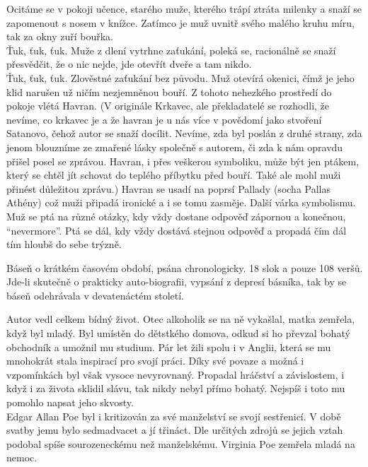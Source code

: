 \documentclass[FGBook.tex]{subfiles}
\begin{document}
{\setlength{\parindent}{0pt}\setlength{\parskip}{0.5em}
\noindent Ocitáme se v pokoji učence, starého muže, kterého trápí ztráta milenky
a snaží se zapomenout s nosem v knížce. Zatímco je muž uvnitř svého malého kruhu míru,
tak za okny zuří bouřka.\\
Ťuk, ťuk, ťuk. Muže z dlení vytrhne zaťukání, poleká se, racionálně se snaží přesvědčit,
že o nic nejde, jde otevřít dveře a tam nikdo.\\
Ťuk, ťuk, ťuk. Zlověstné zaťukání bez původu. Muž otevírá okenici,
čímž je jeho klid narušen už ničím nezjemněnou bouří.
Z tohoto nehezkého prostředí do pokoje vlétá Havran.
(V originále Krkavec, ale překladatelé se rozhodli, že nevíme, co krkavec je
a že havran je u nás více v povědomí jako stvoření Satanovo, čehož autor se snaží docílit.
Nevíme, zda byl poslán z druhé strany, zda jenom blouzníme ze zmařené lásky společně s autorem,
či zda k nám opravdu přišel posel se zprávou. Havran, i přes veškerou symboliku, může být jen ptákem,
který se chtěl jít schovat do teplého příbytku před bouří. Také ale mohl muži přinést důležitou zprávu.)
Havran se usadí na poprsí Pallady (socha Pallas Athény) což muži připadá ironické a i se tomu zasměje.
Další várka symbolismu.\\
Muž se ptá na různé otázky, kdy vždy dostane odpověď zápornou a konečnou, \enquote{nevermore}.
Ptá se dál, kdy vždy dostává stejnou odpověď a propadá čím dál tím hloubš do sebe trýzně.
}

\noindent 
Báseň o krátkém časovém období, psána chronologicky. 18 slok a pouze 108 veršů.
Jde-li skutečně o prakticky auto-biografii, vypsání z depresí básníka, tak by se báseň odehrávala
v devatenáctém století.







\noindent 
Autor vedl celkem bídný život.
Otec alkoholik se na ně vykašlal, matka zemřela, když byl mladý.
Byl umístěn do dětstkého domova, odkud si ho převzal bohatý obchodník a umožnil mu studium.
Pár let žili spolu i v Anglii, která se mu mnohokrát stala inspirací pro svojí práci.
Díky své povaze a možná i vzpomínkách byl však vysoce nevyrovnaný.
Propadal hráčství a závislostem, i když i za života sklidil slávu, tak nikdy nebyl přímo bohatý.
Nejspíš i toto mu pomohlo napsat jeho skvosty.\\
Edgar Allan Poe byl i kritizován za své manželství se svojí sestřenicí.
V době svatby jemu bylo sedmadvacet a jí třináct.
Dle určitých zdrojů se jejich vztah podobal spíše sourozeneckému než manželskému.
Virginia Poe zemřela mladá na nemoc.
\end{document}
